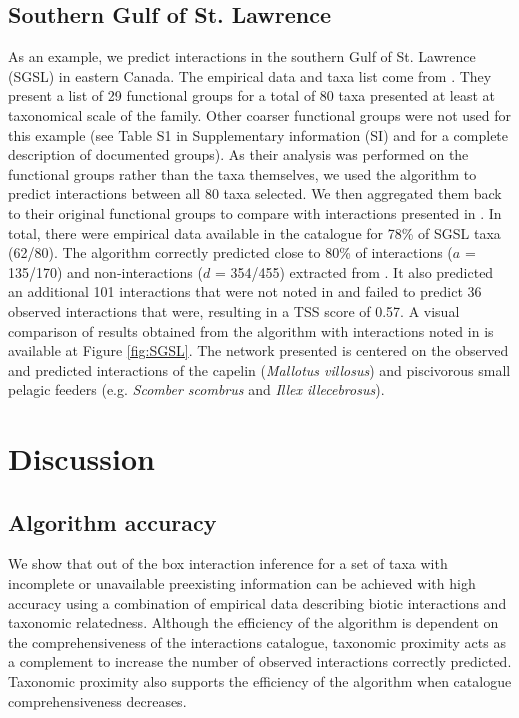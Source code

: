 \documentclass[letterpaper]{article}
\begin{document}
    \subsection{Southern Gulf of St. Lawrence}
As an example, we predict interactions in the southern Gulf of St. Lawrence (SGSL) in eastern Canada. The empirical data and taxa list come from \citet{Savenkoff2004}. They present a list of 29 functional groups for a total of 80 taxa presented at least at taxonomical scale of the family. Other coarser functional groups were not used for this example (see Table S1 in Supplementary information (SI) and \citet{Savenkoff2004} for a complete description of documented groups).
As their analysis was performed on the functional groups rather than the taxa themselves, we used the algorithm to predict interactions between all 80 taxa selected. We then aggregated them back to their original functional groups to compare with interactions presented in \citet{Savenkoff2004}. In total, there were empirical data available in the catalogue for 78\% of SGSL taxa (62/80). The algorithm correctly predicted close to 80\% of interactions ($a$ = 135/170) and non-interactions ($d$ = 354/455) extracted from \citet{Savenkoff2004}. It also predicted an additional 101 interactions that were not noted in \citet{Savenkoff2004} and failed to predict 36 observed interactions that were, resulting in a TSS score of 0.57. A visual comparison of results obtained from the algorithm with interactions noted in \citet{Savenkoff2004} is available at Figure \ref{fig:SGSL}. The network presented is centered on the observed and predicted interactions of the capelin (\textit{Mallotus villosus}) and piscivorous small pelagic feeders (e.g. \textit{Scomber scombrus} and \textit{Illex illecebrosus}).


\section{Discussion}
\subsection{Algorithm accuracy}
We show that out of the box interaction inference for a set of taxa with incomplete or unavailable preexisting information can be achieved with high accuracy using a combination of empirical data describing biotic interactions and taxonomic relatedness. Although the efficiency of the algorithm is dependent on the comprehensiveness of the interactions catalogue, taxonomic proximity acts as a complement to increase the number of observed interactions correctly predicted. Taxonomic proximity also supports the efficiency of the algorithm when catalogue comprehensiveness decreases.
\end{document}

